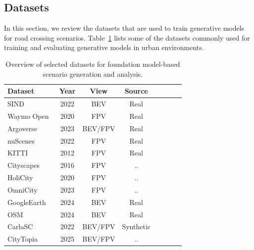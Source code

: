 \documentclass{article}
\begin{document}
\subsection{Datasets}

In this section, we review the datasets that are used to train generative models for road crossing scenarios. Table~\ref{tab:datasets} lists some of the datasets commonly used for training and evaluating generative models in urban environments.

\begin{table}[ht]
\centering
\caption{Overview of selected datasets for foundation model-based scenario generation and analysis.}
\label{tab:datasets}
\renewcommand{\arraystretch}{1.1}
\begin{tabular}{lccccccc}
\toprule
\textbf{Dataset} & \textbf{Year} & \textbf{View} & \textbf{Source} \\
\midrule
SIND~\cite{xu2022drone}             & 2022 & BEV        & Real         \\
Waymo Open~\cite{sun2020scalability}       & 2020 & FPV        & Real  \\
Argoverse~\cite{chang2019argoverse}\cite{wilson2023argoverse}        & 2023 & BEV/FPV    & Real \\
nuScenes~\cite{caesar2020nuscenes}      & 2022 & FPV        & Real \\
KITTI~\cite{geiger2012we}            & 2012 & FPV        & Real \\
Cityscapes~\cite{cordts2016cityscapes}      & 2016 & FPV        & .. \\
HoliCity~\cite{zhou2020holicity}          & 2020 & FPV        & .. \\
OmniCity~\cite{li2023omnicity}          & 2023 & FPV        & ..  \\
GoogleEarth~\cite{xie2024citydreamer}          & 2024 & BEV        & Real  \\
OSM~\cite{xie2024citydreamer}          & 2024 & BEV        & Real \\
CarlaSC~\cite{wilson2022motionsc}          & 2022 & BEV/FPV    & Synthetic \\
CityTopia~\cite{xie2025citydreamer4d}          & 2025 & BEV/FPV    & .. \\
\bottomrule
\end{tabular}
\end{table}
\end{document}
